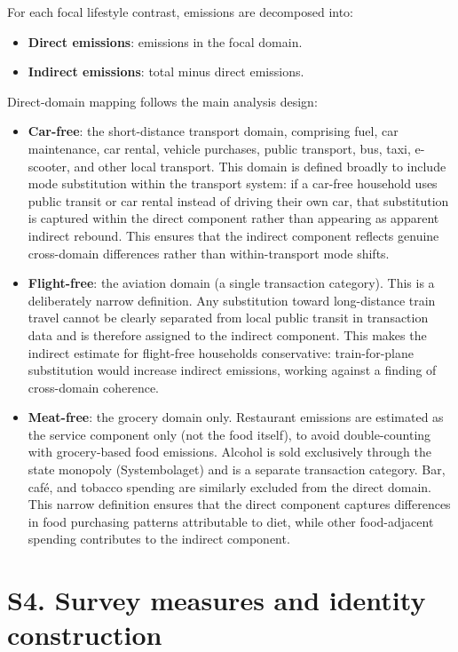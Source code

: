 \documentclass[12pt]{article}
\begin{document}
For each focal lifestyle contrast, emissions are decomposed into:
\begin{itemize}
  \item \textbf{Direct emissions}: emissions in the focal domain.
  \item \textbf{Indirect emissions}: total minus direct emissions.
\end{itemize}

Direct-domain mapping follows the main analysis design:
\begin{itemize}
  \item \textbf{Car-free}: the short-distance transport domain, comprising fuel, car maintenance, car rental, vehicle purchases, public transport, bus, taxi, e-scooter, and other local transport. This domain is defined broadly to include mode substitution within the transport system: if a car-free household uses public transit or car rental instead of driving their own car, that substitution is captured within the direct component rather than appearing as apparent indirect rebound. This ensures that the indirect component reflects genuine cross-domain differences rather than within-transport mode shifts.
  \item \textbf{Flight-free}: the aviation domain (a single transaction category). This is a deliberately narrow definition. Any substitution toward long-distance train travel cannot be clearly separated from local public transit in transaction data and is therefore assigned to the indirect component. This makes the indirect estimate for flight-free households conservative: train-for-plane substitution would increase indirect emissions, working against a finding of cross-domain coherence.
  \item \textbf{Meat-free}: the grocery domain only. Restaurant emissions are estimated as the service component only (not the food itself), to avoid double-counting with grocery-based food emissions. Alcohol is sold exclusively through the state monopoly (Systembolaget) and is a separate transaction category. Bar, café, and tobacco spending are similarly excluded from the direct domain. This narrow definition ensures that the direct component captures differences in food purchasing patterns attributable to diet, while other food-adjacent spending contributes to the indirect component.
\end{itemize}

\section*{S4. Survey measures and identity construction}
\end{document}
